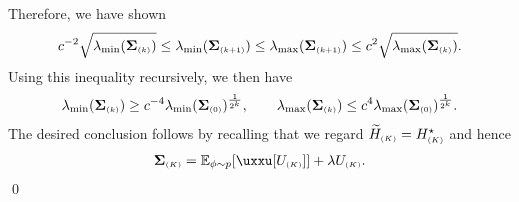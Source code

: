 Therefore, we have shown
\begin{align*}
    c^{-2} \sqrt{ \lmin(\cov\kk) }\leq \lmin(\cov\kp)\leq \lmax(\cov\kp)\leq c^2 \sqrt{ \lmax(\cov\kk) }.
\end{align*}
Using this inequality recursively, we then have
\begin{align*}
    \lmin(\cov\kk)\geq c^{-4}\lmin(\cov\kz)^{\frac{1}{2^k}}, \qquad
    \lmax(\cov\kk)\leq c^{4}\lmax(\cov\kz)^{\frac{1}{2^k}}.
\end{align*}
The desired conclusion follows by recalling that we regard $\til H\kc=\Hs\kc$ and hence
\begin{align*}
    \cov\kc=\Ep{ \uxxu[U\kc] }+\lambda U\kc.
\end{align*}
\qed
